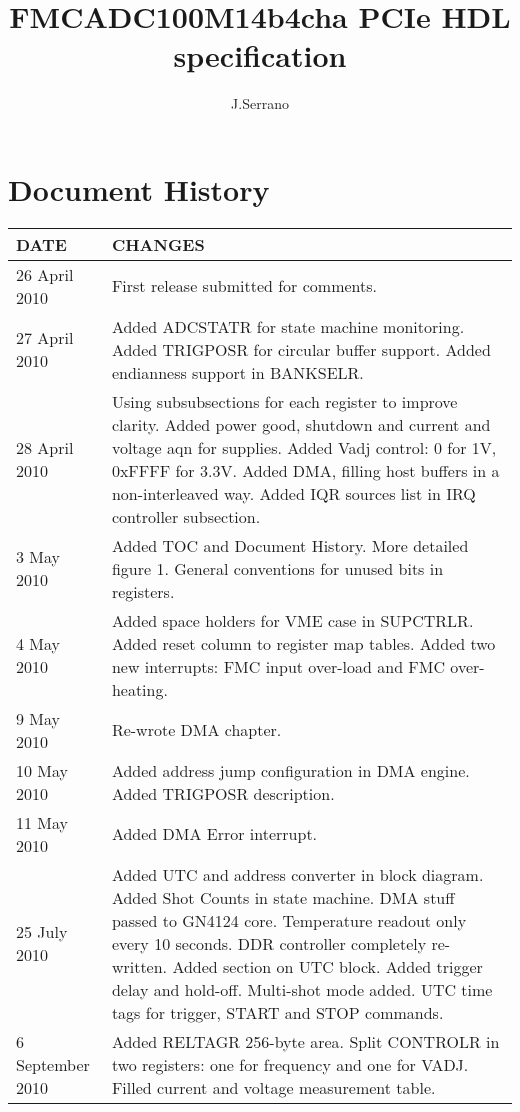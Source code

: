 \documentclass{article}
\title{FMCADC100M14b4cha PCIe HDL specification}
\author{J.Serrano}
\begin{document}
\maketitle
\pagebreak

\section*{Document History}
\begin{table}[htbp]
  \centering
  \begin{tabularx}{\textwidth}{|l|X|}
    \hline
    \textbf{DATE} & \textbf{CHANGES} \\
    \hline
    \hline
    26 April 2010 & First release submitted for comments.\\
    \hline
    27 April 2010 & Added ADCSTATR for state machine monitoring. Added TRIGPOSR for circular buffer support. Added endianness support in BANKSELR.\\
    \hline
    28 April 2010 & Using subsubsections for each register to improve clarity. Added power good, shutdown and current and voltage aqn for supplies. Added Vadj control: 0 for 1V, 0xFFFF for 3.3V. Added DMA, filling host buffers in a non-interleaved way. Added IQR sources list in IRQ controller subsection.\\
    \hline
    3 May 2010 & Added TOC and Document History. More detailed figure 1. General conventions for unused bits in registers. \\ 
    \hline
    4 May 2010 & Added space holders for VME case in SUPCTRLR. Added reset column to register map tables. Added two new interrupts: FMC input over-load and FMC over-heating.\\
    \hline
    9 May 2010 & Re-wrote DMA chapter.\\
    \hline
    10 May 2010 & Added address jump configuration in DMA engine. Added TRIGPOSR description.\\
    \hline
    11 May 2010 & Added DMA Error interrupt.\\
    \hline
    25 July 2010 & Added UTC and address converter in block diagram. Added Shot Counts in state machine. DMA stuff passed to GN4124 core. Temperature readout only every 10 seconds. DDR controller completely re-written. Added section on UTC block. Added trigger delay and hold-off. Multi-shot mode added. UTC time tags for trigger, START and STOP commands.\\
    \hline
    6 September 2010 & Added RELTAGR 256-byte area. Split CONTROLR in two registers: one for frequency and one for VADJ. Filled current and voltage measurement table.\\
    \hline
  \end{tabularx}
\end{table}
\end{document}

